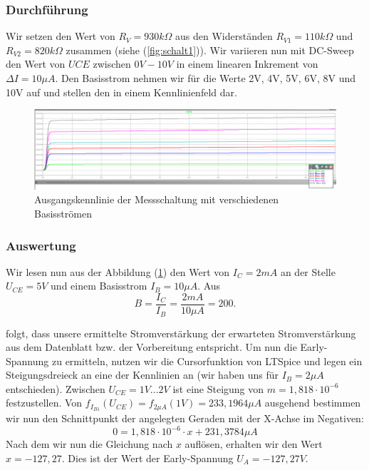 \documentclass{article}
\begin{document}
\subsubsection{Durchführung}
Wir setzen den Wert von $R_{V} = 930k\Omega$ aus den Widerständen $R_{V1} = 110k\Omega$ und $R_{V2} = 820k\Omega$ zusammen (siehe (\ref{fig:schalt1})). Wir variieren nun mit DC-Sweep den Wert von $UCE$ zwischen $0V-10V$ in einem linearen Inkrement von $\Delta I = 10\mu A$. Den Basisstrom nehmen wir für die Werte 2V, 4V, 5V, 6V, 8V und 10V auf und stellen den in einem Kennlinienfeld dar.

\begin{figure}[h]
  \centering
  \includegraphics[width=\textwidth]{../assets/images/EL1P3/ausgangskennlinie.png}
  \caption{Ausgangskennlinie der Messschaltung mit verschiedenen Basisströmen}
  \label{fig:ausgang}
\end{figure}

\subsubsection{Auswertung}

Wir lesen nun aus der Abbildung (\ref{fig:ausgang}) den Wert von $I_{C} = 2mA$ an der Stelle $U_{CE} = 5V$ und einem Basisstrom $I_{B} = 10\mu A$. Aus
\begin{equation}
  \label{eq:3}
  B = \frac{I_{C}}{I_{B}} = \frac{2mA}{10\mu A} = 200.
\end{equation}

folgt, dass unsere ermittelte Stromverstärkung der erwarteten Stromverstärkung aus dem Datenblatt bzw. der Vorbereitung entspricht. Um nun die Early-Spannung zu ermitteln, nutzen wir die Cursorfunktion von LTSpice und legen ein Steigungsdreieck an eine der Kennlinien an (wir haben uns für $I_{B} = 2\mu A$ entschieden). Zwischen $U_{CE} = 1V...2V$ ist eine Steigung von $m = 1,818\cdot 10^{-6}$ festzustellen. Von $f_{I_{B1}}(U_{CE}) = f_{2\mu A}(1V) = 233,1964\mu A$ ausgehend bestimmen wir nun den Schnittpunkt der angelegten Geraden mit der X-Achse im Negativen:
\begin{equation}
  \label{eq:4}
  0 = 1,818\cdot 10^{-6}\cdot x + 231,3784\mu A
\end{equation}
Nach dem wir nun die Gleichung nach $x$ auflösen, erhalten wir den Wert $x = -127,27$. Dies ist der Wert der Early-Spannung $U_{A} = -127,27V$.
\newpage
\end{document}
